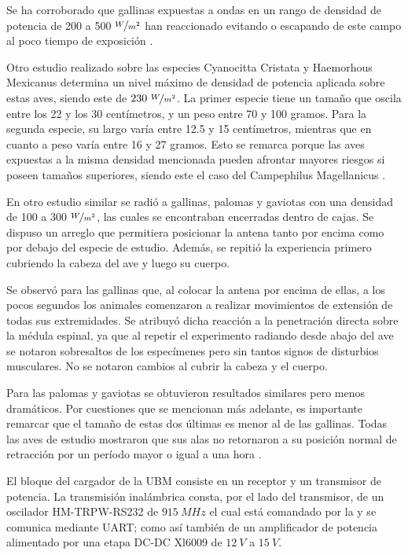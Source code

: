 Se ha corroborado que gallinas expuestas a ondas en un rango de densidad de potencia de 200 a 500 $\nicefrac{W}{{m}^2}$ han reaccionado evitando o escapando de este campo al poco tiempo de exposición \cite{ref:non-termal}.

Otro estudio realizado sobre las especies Cyanocitta Cristata y Haemorhous Mexicanus determina un nivel máximo de densidad de potencia aplicada sobre estas aves, siendo este de $230 \ \nicefrac{W}{{m}^2}$. La primer especie tiene un tamaño que oscila entre los 22 y los 30 centímetros, y un peso entre 70 y 100 gramos. Para la segunda especie, su largo varía entre 12.5 y 15 centímetros, mientras que en cuanto a peso varía entre 16 y 27 gramos. Esto se remarca porque las aves expuestas a la misma densidad mencionada pueden afrontar mayores riesgos si poseen tamaños superiores, siendo este el caso del Campephilus Magellanicus \cite{ref:thermo-birds}.

En otro estudio similar se radió a gallinas, palomas y gaviotas con una densidad de 100 a 300 $\nicefrac{W}{{m}^2}$, las cuales se encontraban encerradas dentro de cajas. Se dispuso un arreglo que permitiera posicionar la antena tanto por encima como por debajo del especie de estudio. Además, se repitió la experiencia primero cubriendo la cabeza del ave y luego su cuerpo.

Se observó para las gallinas que, al colocar la antena por encima de ellas, a los pocos segundos los animales comenzaron a realizar movimientos de extensión de todas sus extremidades. Se atribuyó dicha reacción a la penetración directa sobre la médula espinal, ya que al repetir el experimento radiando desde abajo del ave se notaron sobresaltos de los especímenes pero sin tantos signos de disturbios musculares. No se notaron cambios al cubrir la cabeza y el cuerpo.

Para las palomas y gaviotas se obtuvieron resultados similares pero menos dramáticos. Por cuestiones que se mencionan más adelante, es importante remarcar que el tamaño de estas dos últimas es menor al de las gallinas. Todas las aves de estudio mostraron que sus alas no retornaron a su posición normal de retracción por un período mayor o igual a una hora \cite{ref:effect-radiation}.


El bloque del cargador de la UBM consiste en un receptor y un transmisor de potencia. La transmisión inalámbrica consta, por el lado del transmisor, de un oscilador HM-TRPW-RS232 de $915 \ MHz$ el cual está comandado por la \rpi y se comunica mediante UART; como así también de un amplificador de potencia alimentado por una etapa DC-DC Xl6009 de $12 \ V$ a $15 \ V$.

